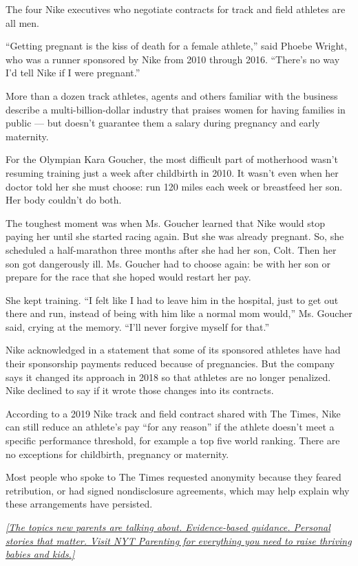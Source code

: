 The four Nike executives who negotiate contracts for track and field
athletes are all men.

``Getting pregnant is the kiss of death for a female athlete,'' said
Phoebe Wright, who was a runner sponsored by Nike from 2010 through
2016. ``There's no way I'd tell Nike if I were pregnant.''

More than a dozen track athletes, agents and others familiar with the
business describe a multi-billion-dollar industry that praises women for
having families in public --- but doesn't guarantee them a salary during
pregnancy and early maternity.

For the Olympian Kara Goucher, the most difficult part of motherhood
wasn't resuming training just a week after childbirth in 2010. It wasn't
even when her doctor told her she must choose: run 120 miles each week
or breastfeed her son. Her body couldn't do both.

The toughest moment was when Ms. Goucher learned that Nike would stop
paying her until she started racing again. But she was already pregnant.
So, she scheduled a half-marathon three months after she had her son,
Colt. Then her son got dangerously ill. Ms. Goucher had to choose again:
be with her son or prepare for the race that she hoped would restart her
pay.

She kept training. ``I felt like I had to leave him in the hospital,
just to get out there and run, instead of being with him like a normal
mom would,'' Ms. Goucher said, crying at the memory. ``I'll never
forgive myself for that.''

Nike acknowledged in a statement that some of its sponsored athletes
have had their sponsorship payments reduced because of pregnancies. But
the company says it changed its approach in 2018 so that athletes are no
longer penalized. Nike declined to say if it wrote those changes into
its contracts.

According to a 2019 Nike track and field contract shared with The Times,
Nike can still reduce an athlete's pay ``for any reason'' if the athlete
doesn't meet a specific performance threshold, for example a top five
world ranking. There are no exceptions for childbirth, pregnancy or
maternity.

Most people who spoke to The Times requested anonymity because they
feared retribution, or had signed nondisclosure agreements, which may
help explain why these arrangements have persisted.

\href{https://parenting.nytimes3xbfgragh.onion/}{\emph{{[}The topics new
parents are talking about. Evidence-based guidance. Personal stories
that matter. Visit NYT Parenting for everything you need to raise
thriving babies and kids.{]}}}

